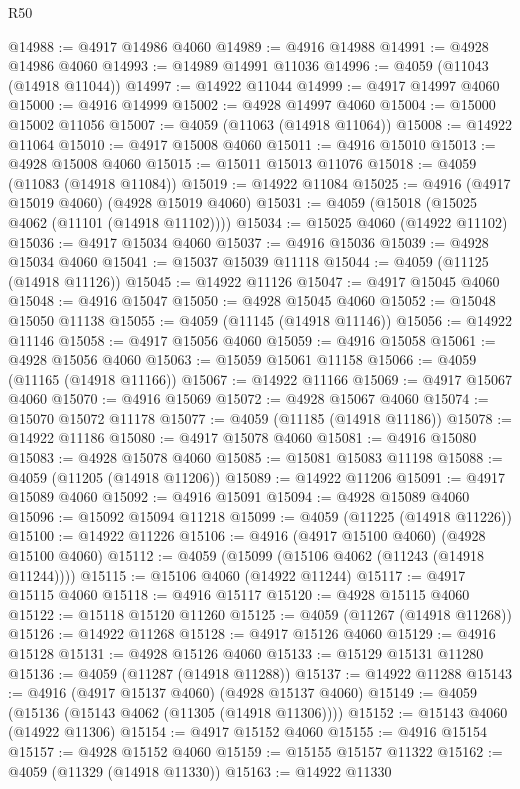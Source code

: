 \begin{lexlean}{R50}
\begin{coremodule}
@14988 := @4917 @14986 @4060
@14989 := @4916 @14988
@14991 := @4928 @14986 @4060
@14993 := @14989 @14991 @11036
@14996 := @4059 (@11043 (@14918 @11044))
@14997 := @14922 @11044
@14999 := @4917 @14997 @4060
@15000 := @4916 @14999
@15002 := @4928 @14997 @4060
@15004 := @15000 @15002 @11056
@15007 := @4059 (@11063 (@14918 @11064))
@15008 := @14922 @11064
@15010 := @4917 @15008 @4060
@15011 := @4916 @15010
@15013 := @4928 @15008 @4060
@15015 := @15011 @15013 @11076
@15018 := @4059 (@11083 (@14918 @11084))
@15019 := @14922 @11084
@15025 := @4916 (@4917 @15019 @4060) (@4928 @15019 @4060)
@15031 := @4059 (@15018 (@15025 @4062 (@11101 (@14918 @11102))))
@15034 := @15025 @4060 (@14922 @11102)
@15036 := @4917 @15034 @4060
@15037 := @4916 @15036
@15039 := @4928 @15034 @4060
@15041 := @15037 @15039 @11118
@15044 := @4059 (@11125 (@14918 @11126))
@15045 := @14922 @11126
@15047 := @4917 @15045 @4060
@15048 := @4916 @15047
@15050 := @4928 @15045 @4060
@15052 := @15048 @15050 @11138
@15055 := @4059 (@11145 (@14918 @11146))
@15056 := @14922 @11146
@15058 := @4917 @15056 @4060
@15059 := @4916 @15058
@15061 := @4928 @15056 @4060
@15063 := @15059 @15061 @11158
@15066 := @4059 (@11165 (@14918 @11166))
@15067 := @14922 @11166
@15069 := @4917 @15067 @4060
@15070 := @4916 @15069
@15072 := @4928 @15067 @4060
@15074 := @15070 @15072 @11178
@15077 := @4059 (@11185 (@14918 @11186))
@15078 := @14922 @11186
@15080 := @4917 @15078 @4060
@15081 := @4916 @15080
@15083 := @4928 @15078 @4060
@15085 := @15081 @15083 @11198
@15088 := @4059 (@11205 (@14918 @11206))
@15089 := @14922 @11206
@15091 := @4917 @15089 @4060
@15092 := @4916 @15091
@15094 := @4928 @15089 @4060
@15096 := @15092 @15094 @11218
@15099 := @4059 (@11225 (@14918 @11226))
@15100 := @14922 @11226
@15106 := @4916 (@4917 @15100 @4060) (@4928 @15100 @4060)
@15112 := @4059 (@15099 (@15106 @4062 (@11243 (@14918 @11244))))
@15115 := @15106 @4060 (@14922 @11244)
@15117 := @4917 @15115 @4060
@15118 := @4916 @15117
@15120 := @4928 @15115 @4060
@15122 := @15118 @15120 @11260
@15125 := @4059 (@11267 (@14918 @11268))
@15126 := @14922 @11268
@15128 := @4917 @15126 @4060
@15129 := @4916 @15128
@15131 := @4928 @15126 @4060
@15133 := @15129 @15131 @11280
@15136 := @4059 (@11287 (@14918 @11288))
@15137 := @14922 @11288
@15143 := @4916 (@4917 @15137 @4060) (@4928 @15137 @4060)
@15149 := @4059 (@15136 (@15143 @4062 (@11305 (@14918 @11306))))
@15152 := @15143 @4060 (@14922 @11306)
@15154 := @4917 @15152 @4060
@15155 := @4916 @15154
@15157 := @4928 @15152 @4060
@15159 := @15155 @15157 @11322
@15162 := @4059 (@11329 (@14918 @11330))
@15163 := @14922 @11330

\end{coremodule}
\end{lexlean}

